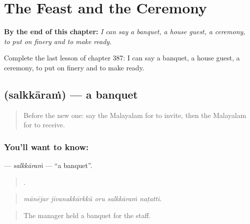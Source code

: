 
\chapter{The Feast and the Ceremony}
\label{ch:ml-the-feast-and-the-ceremony}

\begin{chapteropening}
\textbf{By the end of this chapter:} \emph{I can say a banquet, a house guest, a ceremony, to put on finery and to make ready.}

Complete the last lesson of chapter 387: I can say a banquet, a house guest, a ceremony, to put on finery and to make ready.
\end{chapteropening}

\section[\texorpdfstring{\ml{സൽക്കാരം} (salkkāraṁ)}{സൽക്കാരം (salkkāraṁ)}]{ (salkkāraṁ) — a banquet}

\label{lesson:ML-C387-salkkaram}



\begin{quote}
Before the new one: say the Malayalam for to invite, then the Malayalam for to receive.
\end{quote}

\subsection*{You'll want to know: }
\textbf{} — \emph{salkkāraṁ} — \textquotedblleft{}a banquet\textquotedblright{}.

\begin{quote}
    .
\end{quote}

\begin{quote}
\emph{mānējar jīvanakkārkkŭ oru salkkāraṁ naṭatti.}
\end{quote}

\begin{quote}
The manager held a banquet for the staff.
\end{quote}

